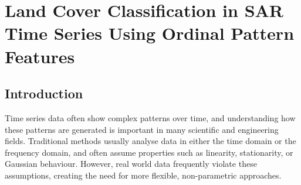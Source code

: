 \chapter{Land Cover Classification in SAR Time Series Using Ordinal Pattern Features}\label{C:Application1}	
	
\begin{abstract}
This study investigates ordinal-pattern-based features for Land Use/Land Cover (LULC) classification using Synthetic Aperture Radar (SAR) time series data. Temporal dynamics are characterized through normalized Shannon entropy, Shannon statistical complexity, Fisher Information Measure (FIM), and Fisher-based complexity derived from ordinal pattern distribution. The methodology is applied to SAR time series from five LULC classes: Agriculture, Deforested, Forest, Urban, and Water. The resulting features are analysed using Shannon and Fisher information-complexity planes and a Support Vector Machine (SVM) classifier. The information-complexity representations reveal partial class separation, with Agriculture exhibiting the clearest distinction from the remaining classes, while substantial overlap persists among Forest, Deforested, Urban, and Water samples. Classification results show that Agriculture and Forest achieved the highest sensitivities (\SI{83.3}{\percent} and \SI{91.7}{\percent}, respectively), whereas Urban and Water remain the most challenging LULC classes to distinguish. These findings indicate that ordinal-pattern-based features capture meaningful temporal characteristics of SAR time series and provide useful information for LULC classification, although discrimination among classes with similar temporal dynamics remains challenging.

\end{abstract}

\section{Introduction}\label{introduction}

Time series data often show complex patterns over time, and understanding how these patterns are generated is important in many scientific and engineering fields. Traditional methods usually analyse
data in either the time domain or the frequency domain, and often assume properties such as linearity, stationarity, or Gaussian behaviour. However, real world data frequently violate these assumptions, creating the need for more flexible, non-parametric approaches.

